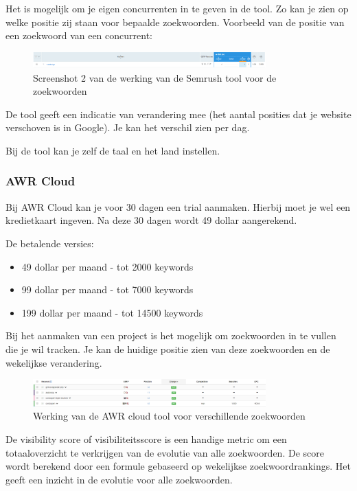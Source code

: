 Het is mogelijk om je eigen concurrenten in te geven in de tool. Zo kan je zien op welke positie zij staan voor bepaalde zoekwoorden. Voorbeeld van de positie van een zoekwoord van een concurrent: 

\begin{figure}[h!]
\centering
\includegraphics[width=0.8\textwidth]{img/semrushcompetitie.PNG}
\caption{Screenshot 2 van de werking van de Semrush tool voor de zoekwoorden
\autocite{semrush}}
\end{figure}

De tool geeft een indicatie van verandering mee (het aantal posities dat je website verschoven is in Google). Je kan het verschil zien per dag. 

Bij de tool kan je zelf de taal en het land instellen. 

\subsubsection{AWR Cloud}
\label{ch: AWR Cloud}
Bij AWR Cloud kan je voor 30 dagen een trial aanmaken. Hierbij moet je wel een kredietkaart ingeven. Na deze 30 dagen wordt 49 dollar aangerekend. 

De betalende versies: 
\begin{itemize}
\item 49 dollar per maand - tot 2000 keywords
\item 99 dollar per maand - tot 7000 keywords
\item 199 dollar per maand - tot 14500 keywords
\end{itemize}

Bij het aanmaken van een project is het mogelijk om zoekwoorden in te vullen die je wil tracken. Je kan de huidige positie zien van deze zoekwoorden en de wekelijkse verandering. 

\begin{figure}[h!]
\centering
\includegraphics[width=0.8\textwidth]{img/awrcloud.PNG}
\caption{Werking van de AWR cloud tool voor verschillende zoekwoorden
\autocite{awrcloud}}
\end{figure}

De visibility score of visibiliteitsscore is een handige metric om een totaaloverzicht te verkrijgen van de evolutie van alle zoekwoorden. De score wordt berekend door een formule gebaseerd op wekelijkse zoekwoordrankings. Het geeft een inzicht in de evolutie voor alle zoekwoorden. 

